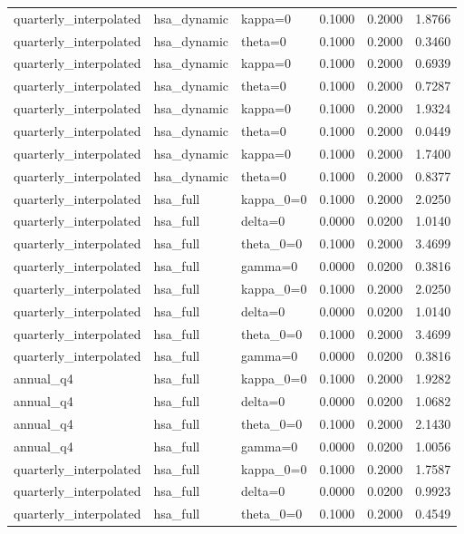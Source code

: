 \begin{tabular}{lllrrr}
quarterly\_interpolated & hsa\_dynamic & kappa=0 & 0.1000 & 0.2000 & 1.8766 \\
quarterly\_interpolated & hsa\_dynamic & theta=0 & 0.1000 & 0.2000 & 0.3460 \\
quarterly\_interpolated & hsa\_dynamic & kappa=0 & 0.1000 & 0.2000 & 0.6939 \\
quarterly\_interpolated & hsa\_dynamic & theta=0 & 0.1000 & 0.2000 & 0.7287 \\
quarterly\_interpolated & hsa\_dynamic & kappa=0 & 0.1000 & 0.2000 & 1.9324 \\
quarterly\_interpolated & hsa\_dynamic & theta=0 & 0.1000 & 0.2000 & 0.0449 \\
quarterly\_interpolated & hsa\_dynamic & kappa=0 & 0.1000 & 0.2000 & 1.7400 \\
quarterly\_interpolated & hsa\_dynamic & theta=0 & 0.1000 & 0.2000 & 0.8377 \\
quarterly\_interpolated & hsa\_full & kappa\_0=0 & 0.1000 & 0.2000 & 2.0250 \\
quarterly\_interpolated & hsa\_full & delta=0 & 0.0000 & 0.0200 & 1.0140 \\
quarterly\_interpolated & hsa\_full & theta\_0=0 & 0.1000 & 0.2000 & 3.4699 \\
quarterly\_interpolated & hsa\_full & gamma=0 & 0.0000 & 0.0200 & 0.3816 \\
quarterly\_interpolated & hsa\_full & kappa\_0=0 & 0.1000 & 0.2000 & 2.0250 \\
quarterly\_interpolated & hsa\_full & delta=0 & 0.0000 & 0.0200 & 1.0140 \\
quarterly\_interpolated & hsa\_full & theta\_0=0 & 0.1000 & 0.2000 & 3.4699 \\
quarterly\_interpolated & hsa\_full & gamma=0 & 0.0000 & 0.0200 & 0.3816 \\
annual\_q4 & hsa\_full & kappa\_0=0 & 0.1000 & 0.2000 & 1.9282 \\
annual\_q4 & hsa\_full & delta=0 & 0.0000 & 0.0200 & 1.0682 \\
annual\_q4 & hsa\_full & theta\_0=0 & 0.1000 & 0.2000 & 2.1430 \\
annual\_q4 & hsa\_full & gamma=0 & 0.0000 & 0.0200 & 1.0056 \\
quarterly\_interpolated & hsa\_full & kappa\_0=0 & 0.1000 & 0.2000 & 1.7587 \\
quarterly\_interpolated & hsa\_full & delta=0 & 0.0000 & 0.0200 & 0.9923 \\
quarterly\_interpolated & hsa\_full & theta\_0=0 & 0.1000 & 0.2000 & 0.4549 \\

\end{tabular}
